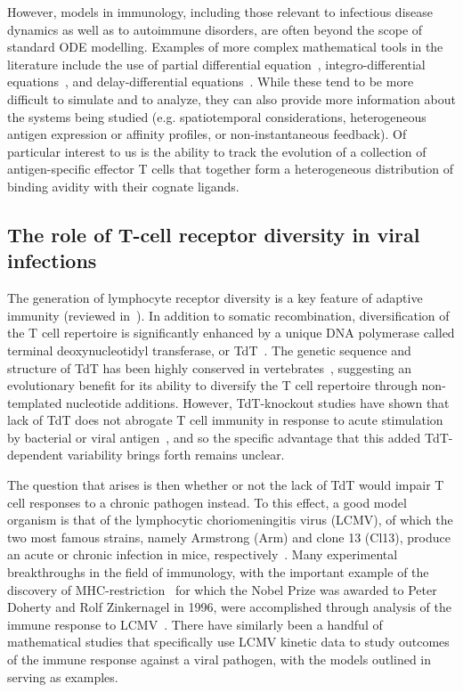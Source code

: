 However, models in immunology, including those relevant to infectious disease dynamics as well as to autoimmune disorders, are often beyond the scope of standard ODE modelling. Examples of more complex mathematical tools in the literature include the use of partial differential equation~\cite{su2009mathematical,moise2019rheumatoid}, integro-differential equations~\cite{jaberi2015continuum,delitala2013mathematical}, and delay-differential equations~\cite{bocharov1998modelling,gourley2008dynamics}. While these tend to be more difficult to simulate and to analyze, they can also provide more information about the systems being studied (e.g. spatiotemporal considerations, heterogeneous antigen expression or affinity profiles, or non-instantaneous feedback). Of particular interest to us is the ability to track the evolution of a collection of antigen-specific effector T cells that together form a heterogeneous distribution of binding avidity with their cognate ligands. 

\subsection*{The role of T-cell receptor diversity in viral infections}

The generation of lymphocyte receptor diversity is a key feature of adaptive immunity (reviewed in~\cite{cooper2006evolution,schatz2011recombination}). In addition to somatic recombination, diversification of the T cell repertoire is significantly enhanced by a unique DNA polymerase called terminal deoxynucleotidyl transferase, or TdT~\cite{cabaniols2001most}. The genetic sequence and structure of TdT has been highly conserved in vertebrates~\cite{lee1994isolation,hansen1997characterization}, suggesting an evolutionary benefit for its ability to diversify the T cell repertoire through non-templated nucleotide additions. However, TdT-knockout studies have shown that lack of TdT does not abrogate T cell immunity in response to acute stimulation by bacterial or viral antigen~\cite{gilfillan1995efficient}, and so the specific advantage that this added TdT-dependent variability brings forth remains unclear.

The question that arises is then whether or not the lack of TdT would impair T cell responses to a chronic pathogen instead. To this effect, a good model organism is that of the lymphocytic choriomeningitis virus (LCMV), of which the two most famous strains, namely Armstrong (Arm) and clone 13 (Cl13),  produce an acute or chronic infection in mice, respectively~\cite{abdel2019viruses}. Many experimental breakthroughs in the field of immunology, with the important example of the discovery of MHC-restriction~\cite{zinkernagel1974restriction} for which the Nobel Prize was awarded to Peter Doherty and Rolf Zinkernagel in 1996, were accomplished through analysis of the immune response to LCMV~\cite{abdel2019viruses,bocharov2015understanding}. There have similarly been a handful of mathematical studies that specifically use LCMV kinetic data to study outcomes of the immune response against a viral pathogen, with the models outlined in~\cite{bocharov1998modelling,kecsmir2003clonal,de2003different,ludewig2004determining} serving as examples.

